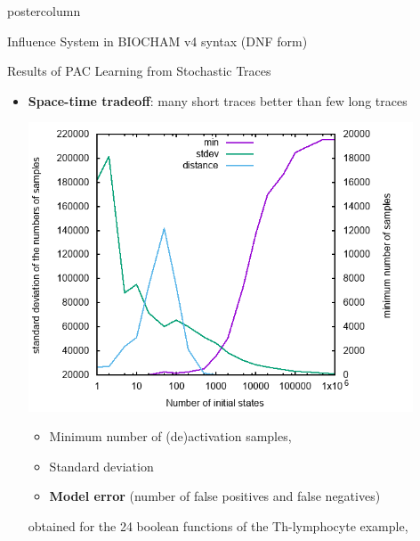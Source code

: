 \documentclass[final,hyperref={pdfpagelabels=false},xcolor=dvipsnames]{beamer}
\newlength{\columnheight}
\begin{document}
\begin{frame}[fragile]
\begin{columns}
    \begin{column}{.49\textwidth}
      \begin{beamercolorbox}[center,wd=\textwidth]{postercolumn}
        \begin{minipage}[T]{.95\textwidth} %
          \parbox[t][\columnheight]{\textwidth}{ %
            \begin{block}{Influence System in BIOCHAM v4 syntax (DNF form)}
\footnotesize
   
	    \end{block}
            \vfill
            \begin{block}{Results of PAC Learning from Stochastic Traces}
\begin{itemize}
\item
{\bf Space-time tradeoff}: many short traces better than few long traces

  \includegraphics[width=0.9\textwidth]{statistics/statistics.png}
\begin{itemize}
\item
Minimum number of (de)activation samples,
\item Standard deviation
\item {\bf Model error} (number of false positives and false negatives) 
\end{itemize}
obtained for the 24 boolean functions of the Th-lymphocyte example, 


\end{itemize}
\end{block}}
\end{minipage}
\end{beamercolorbox}
\end{column}
\end{columns}
\end{frame}
\end{document}
